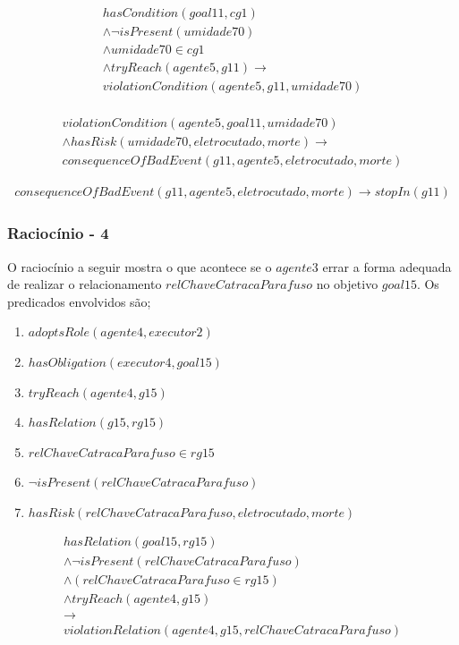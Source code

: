 \documentclass[12pt]{article}
\begin{document}
\begin{eqnarray}
	hasCondition(goal11,cg1) \nonumber \\ 
	\wedge \neg isPresent(umidade70) \nonumber \\
	\wedge umidade70 \in cg1 \nonumber \\
	\wedge tryReach(agente5,g11) \to \nonumber \\  
	violationCondition(agente5,g11,umidade70) \nonumber \\
\end{eqnarray}

\begin{eqnarray} \nonumber
	violationCondition(agente5,goal11,umidade70) \nonumber \\
	\wedge hasRisk(umidade70,eletrocutado,morte) \to \nonumber \\  
	consequenceOfBadEvent(g11,agente5,eletrocutado,morte)
\end{eqnarray}


\begin{eqnarray}
	consequenceOfBadEvent(g11,agente5,eletrocutado,morte) \to stopIn(g11)
\end{eqnarray}
\subsubsection{Raciocínio - 4} 

O raciocínio a seguir mostra o que acontece se o $agente3$ errar a forma adequada de realizar o relacionamento $relChaveCatracaParafuso$ no objetivo $goal15$. Os predicados envolvidos são;

\begin{enumerate}
	\item $adoptsRole(agente4,executor2)$
	\item $hasObligation(executor4,goal15)$	
	\item $tryReach(agente4,g15)$ 
	\item $hasRelation(g15,rg15)$
	\item $relChaveCatracaParafuso \in rg15$	
	\item $\neg isPresent(relChaveCatracaParafuso)$
	\item $hasRisk(relChaveCatracaParafuso,eletrocutado,morte)$
\end{enumerate}

\begin{eqnarray}
	hasRelation(goal15,rg15) \nonumber \\
	\wedge \neg isPresent(relChaveCatracaParafuso)  \nonumber \\ 
	\wedge (relChaveCatracaParafuso \in rg15) \nonumber \\
	\wedge tryReach(agente4,g15) \nonumber \\ 
	\to \nonumber \\ 
	violationRelation(agente4,g15,relChaveCatracaParafuso) \nonumber \\
\end{eqnarray}
\end{document}

